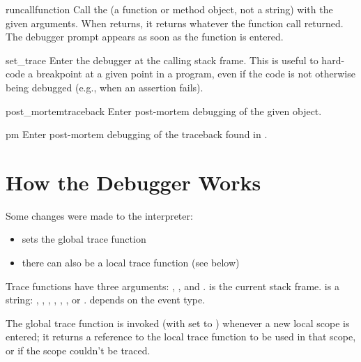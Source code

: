 \begin{funcdesc}{runcall}{function}
Call the  (a function or method object, not a string)
with the given arguments.  When  returns, it returns
whatever the function call returned.  The debugger prompt appears as
soon as the function is entered.
\end{funcdesc}

\begin{funcdesc}{set_trace}{}
Enter the debugger at the calling stack frame.  This is useful to
hard-code a breakpoint at a given point in a program, even if the code
is not otherwise being debugged (e.g., when an assertion fails).
\end{funcdesc}

\begin{funcdesc}{post_mortem}{traceback}
Enter post-mortem debugging of the given  object.
\end{funcdesc}

\begin{funcdesc}{pm}{}
Enter post-mortem debugging of the traceback found in
.
\end{funcdesc}

\section{How the Debugger Works \label{debugger-hooks}}

Some changes were made to the interpreter:

\begin{itemize}
\item {} sets the global trace function
\item there can also be a local trace function (see below)
\end{itemize}

Trace functions have three arguments: , , and
.  is the current stack frame.   is a
string: , , , ,
 , , or . 
 depends on the event type.

The global trace function is invoked (with  set to
) whenever a new local scope is entered; it returns
a reference to the local trace function to be used in that scope, or
 if the scope couldn't be traced.

